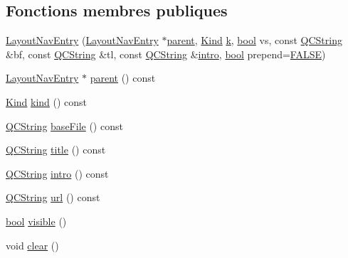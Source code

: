 \subsection*{Fonctions membres publiques}
\begin{DoxyCompactItemize}
\item 
\hyperlink{struct_layout_nav_entry_a03d5b37b6adad3a11d42164cd39fd58f}{Layout\+Nav\+Entry} (\hyperlink{struct_layout_nav_entry}{Layout\+Nav\+Entry} $\ast$\hyperlink{struct_layout_nav_entry_aed3f6a3b545b9b35fe55738d3f809a19}{parent}, \hyperlink{struct_layout_nav_entry_aef36305dd829f7cde87ca203ae647c7c}{Kind} \hyperlink{060__command__switch_8tcl_a20363f854eb4098a446733d63d34dbc1}{k}, \hyperlink{qglobal_8h_a1062901a7428fdd9c7f180f5e01ea056}{bool} vs, const \hyperlink{class_q_c_string}{Q\+C\+String} \&bf, const \hyperlink{class_q_c_string}{Q\+C\+String} \&tl, const \hyperlink{class_q_c_string}{Q\+C\+String} \&\hyperlink{struct_layout_nav_entry_a481ce824c352afcb58a3e202ba0db7c1}{intro}, \hyperlink{qglobal_8h_a1062901a7428fdd9c7f180f5e01ea056}{bool} prepend=\hyperlink{qglobal_8h_a10e004b6916e78ff4ea8379be80b80cc}{F\+A\+L\+S\+E})
\item 
\hyperlink{struct_layout_nav_entry}{Layout\+Nav\+Entry} $\ast$ \hyperlink{struct_layout_nav_entry_aed3f6a3b545b9b35fe55738d3f809a19}{parent} () const 
\item 
\hyperlink{struct_layout_nav_entry_aef36305dd829f7cde87ca203ae647c7c}{Kind} \hyperlink{struct_layout_nav_entry_a8b353e2dc0ba69e6485613969227dcfb}{kind} () const 
\item 
\hyperlink{class_q_c_string}{Q\+C\+String} \hyperlink{struct_layout_nav_entry_aa22eac74aaaa4d6f7b5db3d639c3eb8d}{base\+File} () const 
\item 
\hyperlink{class_q_c_string}{Q\+C\+String} \hyperlink{struct_layout_nav_entry_a342baec1bafe42dee6ba61906099bac2}{title} () const 
\item 
\hyperlink{class_q_c_string}{Q\+C\+String} \hyperlink{struct_layout_nav_entry_a481ce824c352afcb58a3e202ba0db7c1}{intro} () const 
\item 
\hyperlink{class_q_c_string}{Q\+C\+String} \hyperlink{struct_layout_nav_entry_ae6c9108e2c15a7cdf6661634e66442f4}{url} () const 
\item 
\hyperlink{qglobal_8h_a1062901a7428fdd9c7f180f5e01ea056}{bool} \hyperlink{struct_layout_nav_entry_a14dabfdf60d47142677768a4b0735214}{visible} ()
\item 
void \hyperlink{struct_layout_nav_entry_ac705591582b67407e51fbb366eab2c4d}{clear} ()
\item 

\end{DoxyCompactItemize}
